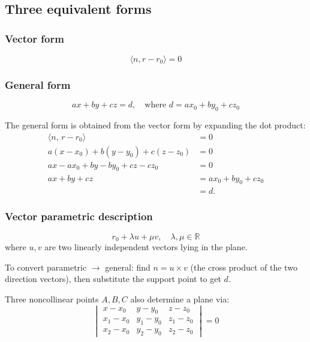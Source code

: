 \documentclass[11pt]{article}
\theoremstyle{plain}
\theoremstyle{definition}
\newcommand{\R}{\mathbb{R}}
\begin{document}
\subsection{Three equivalent forms}

\subsubsection{Vector form}
\[
\langle n, r - r_0 \rangle = 0
\]

\subsubsection{General form}
\[
ax + by + cz = d, \quad \text{where } d = ax_0 + by_0 + cz_0
\]

The general form is obtained from the vector form by expanding the dot product:
\begin{align*}
\langle n,\, r - r_0 \rangle &= 0 \\
a(x - x_0) + b(y - y_0) + c(z - z_0) &= 0 \\
ax - ax_0 + by - by_0 + cz - cz_0 &= 0 \\
ax + by + cz &= ax_0 + by_0 + cz_0 \\
             &= d.
\end{align*}

\subsubsection{Vector parametric description}
\[
r_0 + \lambda u + \mu v, \quad \lambda, \mu \in \R
\]
where $u, v$ are two linearly independent vectors lying in the plane.

\vspace{\baselineskip}

To convert parametric $\rightarrow$ general: find 
$n = u \times v$ (the cross product of the two direction vectors), then substitute the support point to get $d$.

\vspace{\baselineskip}

Three noncollinear points $A, B, C$ also determine a plane via:
\[
\begin{vmatrix}
x - x_0 & y - y_0 & z - z_0 \\
x_1 - x_0 & y_1 - y_0 & z_1 - z_0 \\
x_2 - x_0 & y_2 - y_0 & z_2 - z_0
\end{vmatrix} = 0
\]

\newpage
\end{document}
